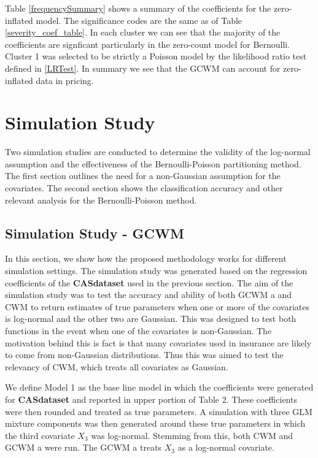 \documentclass[11pt,letterpaper]{article}
\numberwithin{equation}{section}
\numberwithin{equation}{section}
\numberwithin{equation}{section}
\begin{document}
Table \ref{frequencySummary} shows a summary of the coefficients for the zero-inflated model. The
significance codes are the same as of Table \ref{severity_coef_table}. In each cluster we can see that the majority of the coefficients are signficant particularly in the zero-count model for Bernoulli. Cluster 1 was selected to be strictly a Poisson model by the likelihood ratio test defined in \eqref{LRTest}. In summary we see that the GCWM can account for zero-inflated data in pricing.


\section{Simulation Study}

Two simulation studies are conducted to determine the validity of the log-normal assumption and the effectiveness of the Bernoulli-Poisson partitioning method. The first section outlines the need for a non-Gaussian assumption for the covariates. The second section shows the classification accuracy and other relevant analysis for the Bernoulli-Poisson method.


\subsection{Simulation Study - GCWM}


In this section, we show how the proposed methodology works for different simulation settings. The simulation study was generated based on the regression coefficients of the \textbf{CASdataset} used in the previous section. The aim of the simulation study was to test the accuracy and ability of both GCWM a and CWM to return estimates of true parameters when one or more of the covariates is log-normal and the other two are Gaussian. This was designed to test both functions in the event when one of the covariates is non-Gaussian. The motivation behind this is fact is that many covariates used in insurance are likely to come from non-Gaussian distributions. Thus this was aimed to test the relevancy of CWM, which treats all covariates as Gaussian.

We define Model 1 as the base line model in which the coefficients were generated for \textbf{CASdataset} and reported in upper portion of Table 2. These coefficients were then rounded and treated as true parameters. A simulation with three GLM mixture components was then generated around these true parameters in which the third covariate $X_3$ was log-normal. Stemming from this, both CWM and  GCWM a were run. The  GCWM a treats $X_3$ as a log-normal covariate. 
\end{document}

